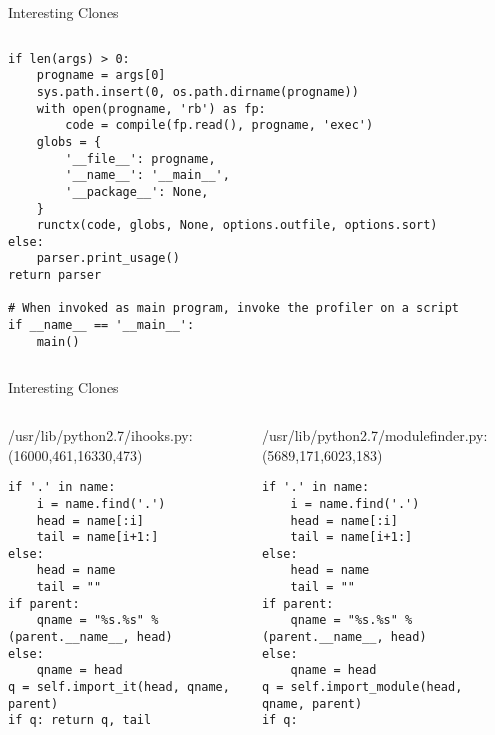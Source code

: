 \begin{frame}[shrink=35,fragile]{Interesting Clones}
\begin{columns}
\begin{column}[t]{0.48\textwidth}
\begin{lstlisting}
if len(args) > 0:
    progname = args[0]
    sys.path.insert(0, os.path.dirname(progname))
    with open(progname, 'rb') as fp:
        code = compile(fp.read(), progname, 'exec')
    globs = {
        '__file__': progname,
        '__name__': '__main__',
        '__package__': None,
    }
    runctx(code, globs, None, options.outfile, options.sort)
else:
    parser.print_usage()
return parser

# When invoked as main program, invoke the profiler on a script
if __name__ == '__main__':
    main()
\end{lstlisting}

\end{column}
\end{columns}

\end{frame}


\begin{frame}[shrink=20,fragile]{Interesting Clones}

\lstset{
    breaklines=true,
    language=Python
}

\begin{columns}
\begin{column}[t]{0.48\textwidth}
/usr/lib/python2.7/ihooks.py:(16000,461,16330,473)
\begin{lstlisting}
if '.' in name:
    i = name.find('.')
    head = name[:i]
    tail = name[i+1:]
else:
    head = name
    tail = ""
if parent:
    qname = "%s.%s" % (parent.__name__, head)
else:
    qname = head
q = self.import_it(head, qname, parent)
if q: return q, tail
\end{lstlisting}
\end{column}

\begin{column}[t]{0.48\textwidth}
/usr/lib/python2.7/modulefinder.py:(5689,171,6023,183)
\begin{lstlisting}
if '.' in name:
    i = name.find('.')
    head = name[:i]
    tail = name[i+1:]
else:
    head = name
    tail = ""
if parent:
    qname = "%s.%s" % (parent.__name__, head)
else:
    qname = head
q = self.import_module(head, qname, parent)
if q:
\end{lstlisting}

\end{column}
\end{columns}

\end{frame}


